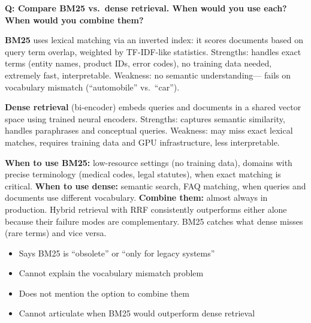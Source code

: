 \begin{interviewq}
\textbf{Q: Compare BM25 vs.\ dense retrieval. When would you use each? When
would you combine them?}

 \quad {} \quad \badgefreq{\freqhigh}

\stronganswer
\textbf{BM25} uses lexical matching via an inverted index: it scores documents
based on query term overlap, weighted by TF-IDF-like statistics.  Strengths:
handles exact terms (entity names, product IDs, error codes), no training data
needed, extremely fast, interpretable.  Weakness: no semantic understanding---
fails on vocabulary mismatch (``automobile'' vs.\ ``car'').

\textbf{Dense retrieval} (bi-encoder) embeds queries and documents in a shared
vector space using trained neural encoders.  Strengths: captures semantic
similarity, handles paraphrases and conceptual queries.  Weakness: may miss
exact lexical matches, requires training data and GPU infrastructure, less
interpretable.

\textbf{When to use BM25:} low-resource settings (no training data), domains
with precise terminology (medical codes, legal statutes), when exact matching
is critical.  \textbf{When to use dense:} semantic search, FAQ matching, when
queries and documents use different vocabulary.  \textbf{Combine them:} almost
always in production.  Hybrid retrieval with RRF consistently outperforms
either alone because their failure modes are complementary.  BM25 catches
what dense misses (rare terms) and vice versa.

\redflags
\begin{itemize}
    \item Says BM25 is ``obsolete'' or ``only for legacy systems''
    \item Cannot explain the vocabulary mismatch problem
    \item Does not mention the option to combine them
    \item Cannot articulate when BM25 would outperform dense retrieval
\end{itemize}



\end{interviewq}
